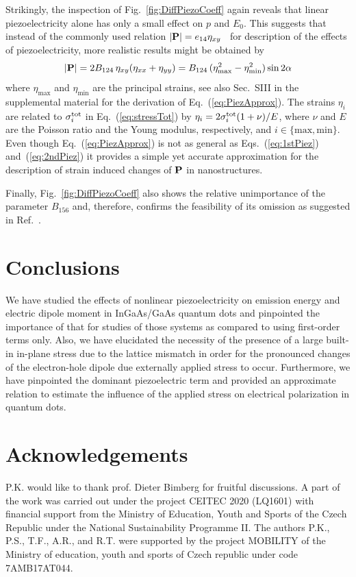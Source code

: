 \documentclass[aps,prl,amsmath,amssymb,twocolumn,showpacs,showkeys,superscriptaddress]{revtex4-1}
\begin{document}
%
Strikingly, the inspection of Fig.~\ref{fig:DiffPiezoCoeff} again reveals that linear piezoelectricity alone has only a small effect on $p$ and $E_0$. 
This suggests that instead of the commonly used
relation $|{\bf P}|=e_{14}\eta_{xy}$~\cite{YuCardona,Fry:00} for description of the effects of piezoelectricity, more realistic results might be obtained by
%
\begin{equation}
\label{eq:PiezApprox}
|{\bf P}|=2B_{124}\,\eta_{xy}(\eta_{xx}+\eta_{yy})=B_{124}\,(\eta^2_{\mathrm{max}}-\eta^2_{\mathrm{min}})\sin2\alpha
\end{equation}
%
%
%
%
where $\eta_{\mathrm{max}}$ and $\eta_{\mathrm{min}}$ are the principal strains, see also Sec.~SIII in the supplemental material for the derivation of Eq.~(\ref{eq:PiezApprox}). The strains $\eta_i$ are related to $\sigma^{\rm{tot}}_i$ in Eq.~(\ref{eq:stressTot}) by $\eta_i=2\sigma^{\rm{tot}}_i(1+\nu)/E$, where $\nu$ and $E$ are the Poisson ratio and the Young modulus, respectively, and $i\in{\{\mathrm{max}, \mathrm{min}\}}$. Even though Eq.~(\ref{eq:PiezApprox}) is not as general as Eqs.~(\ref{eq:1stPiez}) and~(\ref{eq:2ndPiez}) it provides a simple yet accurate approximation for the description of strain induced changes of ${\bf P}$ in nanostructures.
%



Finally, Fig.~\ref{fig:DiffPiezoCoeff} also shows the relative unimportance of the parameter $B_{156}$ and, therefore, confirms the feasibility of its omission as suggested in Ref.~\cite{Tse2013}.




\section{Conclusions}
We have studied the effects of nonlinear piezoelectricity on emission energy and electric dipole moment in InGaAs/GaAs quantum dots and pinpointed the importance of that for studies of those systems as compared to using first-order terms only. Also, we have elucidated the necessity of the presence of a large built-in in-plane stress due to the lattice mismatch in order for the pronounced changes of the electron-hole dipole due externally applied stress to occur. Furthermore, we have pinpointed the dominant piezoelectric term and provided an approximate relation to estimate the influence of the applied stress on electrical polarization in quantum dots.



\section{Acknowledgements}
P.K. would like to thank prof. Dieter Bimberg for fruitful discussions. A part of the work was carried out under the project CEITEC 2020 (LQ1601) with financial support from the Ministry of Education, Youth and Sports of the Czech Republic under the National Sustainability Programme II. The authors P.K., P.S., T.F., A.R., and R.T. were supported by the project MOBILITY of the Ministry of education, youth and sports of Czech republic under code 7AMB17AT044.



\end{document}

